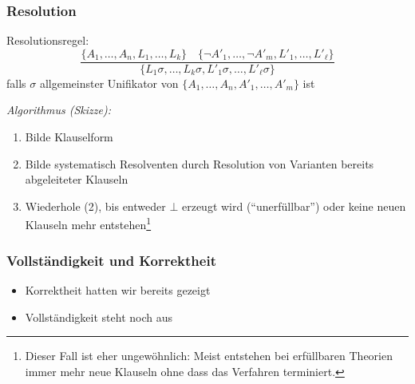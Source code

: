 \documentclass[onlymath]{beamer}
\begin{document}
\maketitle


\begin{frame}\frametitle{Resolution}

Resolutionsregel:
\[  \frac{
\{A_1,\ldots,A_n,L_1,\ldots,L_k\}\quad
\{\neg A'_1,\ldots,\neg A'_m,L'_1,\ldots,L'_\ell\}
}{\{L_1\sigma,\ldots,L_k\sigma,L'_1\sigma,\ldots,L'_\ell\sigma\}
}\]
falls $\sigma$ allgemeinster Unifikator von $\{A_1,\ldots,A_n, A'_1,\ldots, A'_m\}$ ist\bigskip

\emph{Algorithmus (Skizze):}
\begin{enumerate}[(1)]
\item Bilde Klauselform
\item Bilde systematisch Resolventen durch Resolution von Varianten bereits abgeleiteter Klauseln
\item Wiederhole (2), bis entweder $\bot$ erzeugt wird ("`unerfüllbar"') oder keine neuen Klauseln mehr entstehen\footnote{Dieser Fall ist eher ungewöhnlich: Meist entstehen bei erfüllbaren Theorien immer mehr neue Klauseln ohne dass das Verfahren terminiert.}
\end{enumerate}

\end{frame}

\begin{frame}\frametitle{Vollständigkeit und Korrektheit}


\begin{itemize}
\item Korrektheit hatten wir bereits gezeigt
\item Vollständigkeit steht noch aus
\end{itemize}

\end{frame}
\end{document}
